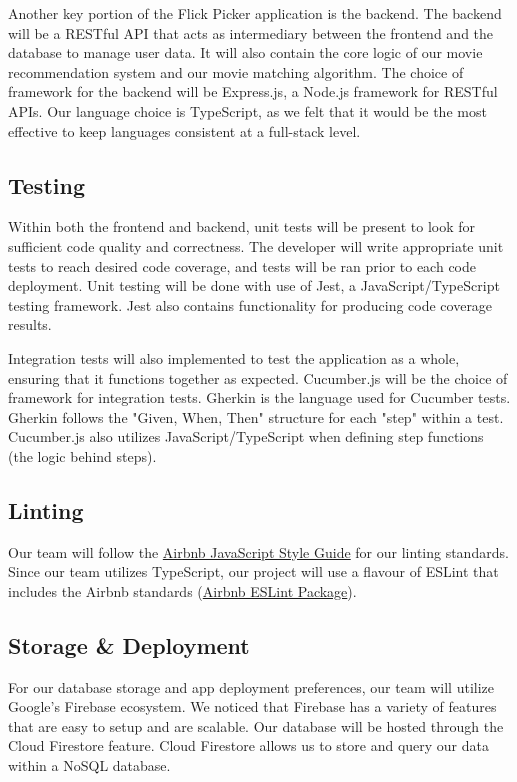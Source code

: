 \documentclass{article}
\begin{document}
Another key portion of the Flick Picker application is the backend. The backend will be a RESTful API that acts as intermediary between the frontend and the database to manage user data. It will also contain the core logic of our movie recommendation system and our movie matching algorithm. The choice of framework for the backend will be Express.js, a Node.js framework for RESTful APIs. Our language choice is TypeScript, as we felt that it would be the most effective to keep languages consistent at a full-stack level.

\subsection{Testing}
Within both the frontend and backend, unit tests will be present to look for sufficient code quality and correctness. The developer will write appropriate unit tests to reach desired code coverage, and tests will be ran prior to each code deployment. Unit testing will be done with use of Jest, a JavaScript/TypeScript testing framework. Jest also contains functionality for producing code coverage results.

Integration tests will also implemented to test the application as a whole, ensuring that it functions together as expected. Cucumber.js will be the choice of framework for integration tests. Gherkin is the language used for Cucumber tests. Gherkin follows the "Given, When, Then" structure for each "step" within a test. Cucumber.js also utilizes JavaScript/TypeScript when defining step functions (the logic behind steps). 


\subsection{Linting}
Our team will follow the \href{https://github.com/airbnb/javascript}{Airbnb JavaScript Style Guide} for our linting standards. Since our team utilizes TypeScript, our project will use a flavour of ESLint that includes the Airbnb standards (\href{https://www.npmjs.com/package/eslint-config-airbnb-typescript}{Airbnb ESLint Package}).

\subsection{Storage \& Deployment}
For our database storage and app deployment preferences, our team will utilize Google's Firebase ecosystem. We noticed that Firebase has a variety of features that are easy to setup and are scalable. Our database will be hosted through the Cloud Firestore feature. Cloud Firestore allows us to store and query our data within a NoSQL database. 
\end{document}
